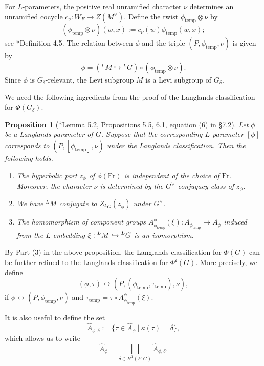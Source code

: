 \documentclass[11pt,letterpaper]{amsart}
\newcommand{\dualgroup}[1]{{#1}^\vee}
\newcommand{\irrepdual}[1]{\widehat{#1}}
\newcommand{\Fr}{\mathrm{Fr}}
\newcommand{\temp}{\mathrm{temp}}
\newtheorem{prop}[thm]{Proposition}
\renewcommand{\1}{\mathbbm{1}}
\numberwithin{equation}{section}
\begin{document}
{For $L$-parameters, the positive real unramified character $\nu$ determines an unramified cocycle $c_{\nu}:W_F \to Z(\dualgroup{M})$. Define the twist $\phi_\temp \otimes \nu$  by 
\[(\phi_\temp \otimes \nu)(w,x):= c_{\nu}(w) \phi_{\temp}(w,x); \]
see \cite{SZ18}*{Definition 4.5}.
The relation between $\phi$ and the triple $(P, \phi_\temp, \nu)$ is given by
\[
\phi = ({}^L M \hookrightarrow {}^L G) \circ (\phi_\temp \otimes \nu).
\]
Since $\phi$ is $G_{\delta}$-relevant, the Levi subgroup $M$ is a Levi subgroup of $G_{\delta}$.



We need the following ingredients from the proof of the Langlands classification for $\Phi(G_{\delta})$.
\begin{prop}[{\cite{SZ18}*{Lemma 5.2, Propositions 5.5, 6.1, equation (6) in \S 7.2}}]\label{prop: SZ18}
   Let $\phi$ be a Langlands parameter of $G$. Suppose that the corresponding $L$-parameter $[\phi]$ corresponds to $(P, [\phi_\temp], \nu)$ under the Langlands classification. Then the following holds.
   \begin{enumerate}
    \item The hyperbolic part $z_{\phi}$ of $\phi(\Fr)$ is independent of the choice of $\Fr$. Moreover, the character $\nu$ is determined by the $\dualgroup{G}$-conjugacy class of $z_{\phi}$.
    \item We have ${}^LM $ conjugate to $ Z_{{}^L G}(z_{\phi})$ under $\dualgroup{G}$.
    \item The homomorphism of component groups $A_{\phi_\temp}^{\phi}(\xi): A_{\phi_\temp} \to A_{\phi}$ induced from the $L$-embedding $\xi: \prescript{L}{}{M} \hookrightarrow \prescript{L}{}{G}$ is an isomorphism.
   \end{enumerate}
\end{prop}

By Part (3) in the above proposition, the Langlands classification for $\Phi(G)$ can be further refined to the Langlands classification for $\Phi^{\mathfrak{e}}(G)$. More precisely, we define
\[ (\phi, \tau) \leftrightarrow (P, (\phi_\temp, \tau_\temp), \nu),\]
if $\phi \leftrightarrow (P, \phi_\temp, \nu)$ and $\tau_\temp = \tau \circ A_{\phi_\temp}^{\phi}(\xi)$.


It is also useful to define the set
\begin{equation}\label{eqn: a phi delta}
    \irrepdual{A}_{\phi,\delta}:=\{\tau \in \irrepdual{A}_\phi\ | \  \kappa(\tau)=\delta\},
\end{equation}
which allows us to write
\[\irrepdual{A}_\phi=\bigsqcup_{\delta\in H^1(F,G)}\irrepdual{A}_{\phi, \delta}.\]

}
\end{document}
